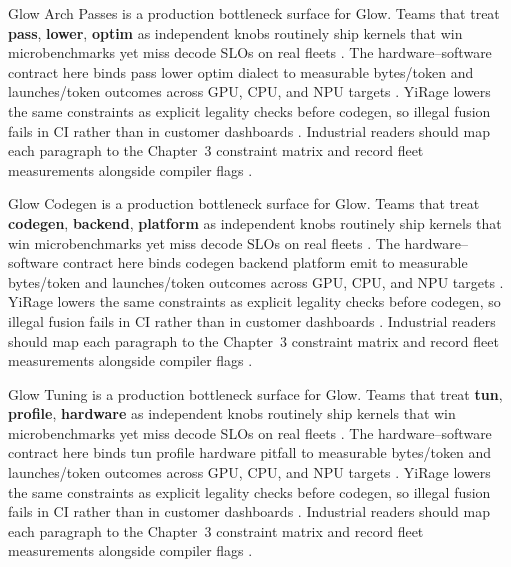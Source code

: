 Glow Arch Passes is a production bottleneck surface for Glow. Teams that treat \textbf{pass}, \textbf{lower}, \textbf{optim} as independent knobs routinely ship kernels that win microbenchmarks yet miss decode SLOs on real fleets \citep{nvidia2024cudagraphs,taxbreak2026}. The hardware--software contract here binds pass lower optim dialect to measurable bytes/token and launches/token outcomes across GPU, CPU, and NPU targets \citep{liu2024deepseekv3,memoryfloor2026}. YiRage lowers the same constraints as explicit legality checks before codegen, so illegal fusion fails in CI rather than in customer dashboards \citep{patel2025llminference,nvidia2022hopper}. Industrial readers should map each paragraph to the Chapter~3 constraint matrix and record fleet measurements alongside compiler flags \citep{taxbreak2026,semianalysis2024tma}.

Glow Codegen is a production bottleneck surface for Glow. Teams that treat \textbf{codegen}, \textbf{backend}, \textbf{platform} as independent knobs routinely ship kernels that win microbenchmarks yet miss decode SLOs on real fleets \citep{liu2024deepseekv3,memoryfloor2026}. The hardware--software contract here binds codegen backend platform emit to measurable bytes/token and launches/token outcomes across GPU, CPU, and NPU targets \citep{patel2025llminference,nvidia2022hopper}. YiRage lowers the same constraints as explicit legality checks before codegen, so illegal fusion fails in CI rather than in customer dashboards \citep{taxbreak2026,semianalysis2024tma}. Industrial readers should map each paragraph to the Chapter~3 constraint matrix and record fleet measurements alongside compiler flags \citep{memoryfloor2026,amd2024xdna}.

Glow Tuning is a production bottleneck surface for Glow. Teams that treat \textbf{tun}, \textbf{profile}, \textbf{hardware} as independent knobs routinely ship kernels that win microbenchmarks yet miss decode SLOs on real fleets \citep{patel2025llminference,nvidia2022hopper}. The hardware--software contract here binds tun profile hardware pitfall to measurable bytes/token and launches/token outcomes across GPU, CPU, and NPU targets \citep{taxbreak2026,semianalysis2024tma}. YiRage lowers the same constraints as explicit legality checks before codegen, so illegal fusion fails in CI rather than in customer dashboards \citep{memoryfloor2026,amd2024xdna}. Industrial readers should map each paragraph to the Chapter~3 constraint matrix and record fleet measurements alongside compiler flags \citep{nvidia2022hopper,amd2024aie}.

